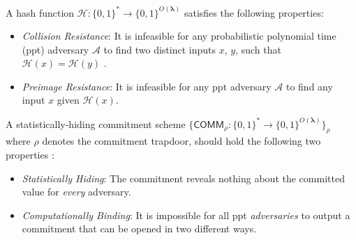 \begin{definition}
	\label{def:Collision-resistance hash function}
	A hash function $\mathcal{H}: \{0, 1\}^\ast \rightarrow \{0,1\}^{O(\boldsymbol{\lambda})}$ satisfies the following properties:
	\begin{itemize}
		\item \textit{Collision Resistance}: It is infeasible for any probabilistic polynomial time (\gls{ppt}) adversary $\mathcal{A}$ to find two distinct inputs $x$, $y$, such that $\mathcal{H}(x) = \mathcal{H}(y)$  \cite{katz2020introduction}.
		\item \textit{Preimage Resistance}: It is infeasible for any \gls{ppt} adversary $\mathcal{A}$ to find any input $x$ given $\mathcal{H}(x)$.
	\end{itemize} 
\end{definition}

\begin{definition}
	\label{def:Statistically-hiding commitment}
	A statistically-hiding commitment scheme  $\{\mathsf{COMM}_\rho:\{0,1\}^* \rightarrow \{0, 1\}^{O(\boldsymbol{\lambda})} \}_\rho$ \cite{zcash-proc} where $\rho$ denotes the commitment trapdoor, should hold the following two properties \cite{katz2020introduction, zcash-proc}:
	\begin{itemize}
		\item \textit{Statistically Hiding}: The commitment reveals nothing about the committed value for \textit{every} adversary. 
		\item \textit{Computationally Binding}: It is impossible for all \gls{ppt} \textit{adversaries} to output a commitment that can be opened in two different ways.
	\end{itemize}
\end{definition}

%	

